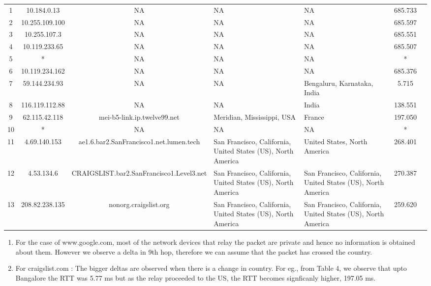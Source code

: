 \documentclass[12pt]{article}
\begin{document}
\begin{enumerate}
\begin{table}[h!]
{\begin{tabular}{|c|c|c| >{\centering\arraybackslash}m{} | >{\centering\arraybackslash}m{} |c|c|}
            \hline
            1 & 10.184.0.13 & NA & NA & NA & 685.733 \\
            2 & 10.255.109.100 & NA & NA & NA & 685.597 \\
            3 & 10.255.107.3 & NA & NA & NA & 685.551 \\
            4 & 10.119.233.65 & NA & NA & NA & 685.507 \\
            5 & * & NA & NA & NA & * \\
            6 & 10.119.234.162 & NA & NA & NA & 685.376 \\
            7 & 59.144.234.93 & NA & NA & Bengaluru, Karnataka, India & 5.715 \\
            8 & 116.119.112.88 & NA & NA & India & 138.551 \\
            9 & 62.115.42.118 & mei-b5-link.ip.twelve99.net & Meridian, Mississippi, USA & France & 197.050 \\
            10 & * & NA & NA & NA & * \\
            11 & 4.69.140.153 & ae1.6.bar2.SanFrancisco1.net.lumen.tech & San Francisco, California, United States (US), North America & United States, North America & 268.401 \\
            12 & 4.53.134.6 & CRAIGSLIST.bar2.SanFrancisco1.Level3.net & San Francisco, California, United States (US), North America & San Francisco, California, United States (US), North America & 270.387 \\
            13 & 208.82.238.135 & nonorg.craigslist.org & San Francisco, California, United States (US), North America & San Francisco, California, United States (US), North America & 259.620 \\
            \hline
        \end{tabular}}
    \end{table}

    \begin{enumerate}
        \item For the case of www.google.com, most of the network devices that relay the packet are private and hence no information is obtained about them. However we observe a delta in 9th hop, therefore we can assume that the packet has crossed the country.
        \item For craigslist.com : The bigger deltas are observed when there is a change in country. For eg., from Table 4, we observe that upto Bangalore the RTT was 5.77 ms but as the relay proceeded to the US, the RTT becomes signficanly higher, 197.05 ms. 
    \end{enumerate}


\end{enumerate}
\end{document}
